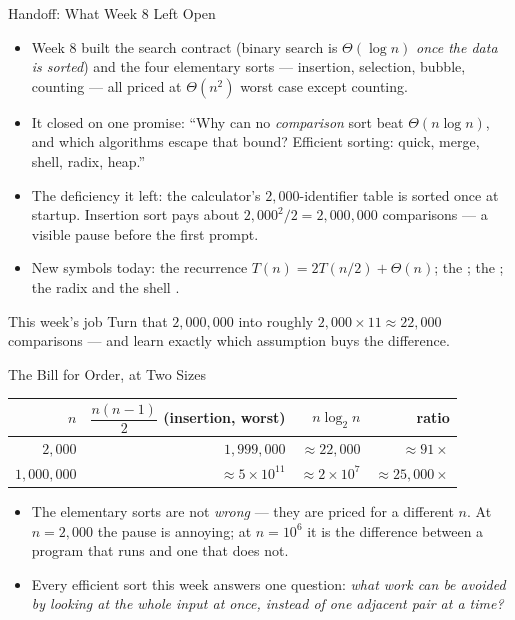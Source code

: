 \documentclass[aspectratio=169]{beamer}
\begin{document}
\begin{frame}{Handoff: What Week 8 Left Open}
  \begin{itemize}
    \item Week 8 built the search contract (binary search is
      $\Theta(\log n)$ \emph{once the data is sorted}) and the four
      elementary sorts --- insertion, selection, bubble, counting --- all
      priced at $\Theta(n^2)$ worst case except counting.
    \item It closed on one promise: ``Why can no \emph{comparison} sort beat
      $\Theta(n \log n)$, and which algorithms escape that bound? Efficient
      sorting: quick, merge, shell, radix, heap.''
    \item The deficiency it left: the calculator's $2{,}000$-identifier
      table is sorted once at startup. Insertion sort pays about
      $2{,}000^2/2 = 2{,}000{,}000$ comparisons --- a visible pause before
      the first prompt.
    \item New symbols today: the recurrence $T(n) = 2T(n/2) + \Theta(n)$;
      the ; the ; the radix  and the
      shell .
  \end{itemize}
  \begin{exampleblock}{This week's job}
    Turn that $2{,}000{,}000$ into roughly $2{,}000 \times 11 \approx
    22{,}000$ comparisons --- and learn exactly which assumption buys the
    difference.
  \end{exampleblock}
\end{frame}

\begin{frame}{The Bill for Order, at Two Sizes}
  \begin{center}
  {\footnotesize
  \begin{tabular}{rrrr}
    \toprule
    $n$ & $\dfrac{n(n-1)}{2}$ (insertion, worst) & $n\log_2 n$ & ratio \\
    \midrule
    $2{,}000$ & $1{,}999{,}000$ & $\approx 22{,}000$ & $\approx 91\times$ \\
    $1{,}000{,}000$ & $\approx 5\times 10^{11}$ & $\approx 2\times 10^{7}$ &
      $\approx 25{,}000\times$ \\
    \bottomrule
  \end{tabular}}
  \end{center}
  \begin{itemize}
    \item The elementary sorts are not \emph{wrong} --- they are priced for a
      different $n$. At $n = 2{,}000$ the pause is annoying; at
      $n = 10^6$ it is the difference between a program that runs and one
      that does not.
    \item Every efficient sort this week answers one question: \emph{what
      work can be avoided by looking at the whole input at once, instead of
      one adjacent pair at a time?}
  \end{itemize}
\end{frame}
\end{document}
